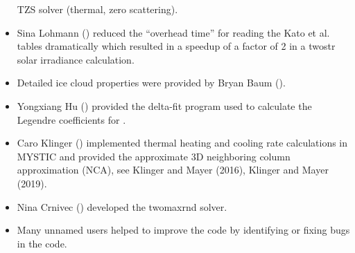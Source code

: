 \begin{itemize}
  TZS solver (thermal, zero scattering).
\item Sina Lohmann () reduced the ``overhead time''
  for reading the Kato et al. tables dramatically which resulted in 
  a speedup of a factor of 2 in a twostr solar irradiance calculation.
\item Detailed ice cloud properties were provided by Bryan Baum
  (). 
\item Yongxiang Hu () provided the delta-fit 
  program used to calculate the Legendre coefficients for .
\item Caro Klinger  () implemented
  thermal heating and cooling rate calculations in MYSTIC and provided the
  approximate 3D neighboring column approximation (NCA), see Klinger
  and Mayer (2016), Klinger and Mayer (2019).
\item Nina Crnivec  ()
  developed the twomaxrnd solver.
\item Many unnamed users helped to improve the code by identifying 
  or fixing bugs in the code. 
\end{itemize}



